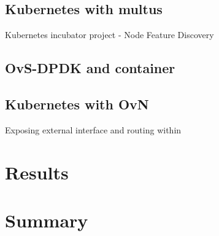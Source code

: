 \documentclass[english, 12pt, a4paper, elec, utf8, a-1b, online]{aaltothesis}
\begin{document}
\subsection{Kubernetes with multus}
Kubernetes incubator project - Node Feature Discovery
\subsection{OvS-DPDK and container}
\subsection{Kubernetes with OvN}
Exposing external interface and routing within
\clearpage
\section{Results}

\clearpage
\section{Summary} 
\end{document}
